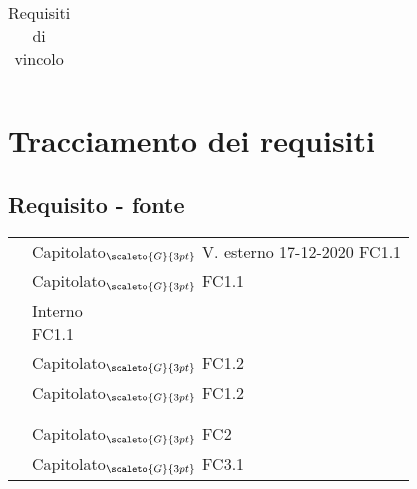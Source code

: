 {{{{\begin{center}
\begin{longtable}{|p{4cm}|p{4cm}|p{4cm}|p{3cm}|}
		\caption[Requisiti di vincolo]{Requisiti di vincolo}\label{4.4}\\
	\end{longtable}
\end{center}

\section{Tracciamento dei requisiti}\label{RequisitiTracciamentoDeiRequisiti}

\subsection{Requisito - fonte}\label{RequisitiTracciamentoDeiRequisitiFonte}

\def\tabularxcolumn#1{m{#1}}
{
	\begin{center}
		\renewcommand{\arraystretch}{1.4}
		\begin{longtable}{|p{7.5cm}|p{7.5cm}|}
		\hline
		\rowcolor{airforceblue}
		\makecell[tc]{\textbf{Codice RS}} & \makecell[c]{\textbf{Fonte}}  \\
		\hline
		\makecell[tc]{RSFO1} & \makecell[tc]{Capitolato$_{\scaleto{G}{3pt}}$\\V. esterno 17-12-2020 \\ FC1.1} \\
		\hline
		\makecell[tc]{RSFF2} & \makecell[tc]{Capitolato$_{\scaleto{G}{3pt}}$ \\ FC1.1}\\
		\hline
		\makecell[tc]{RSFO3} & \makecell[tc]{Interno\\FC1.1}\\
		\hline
		\makecell[tc]{RSFO4.1} & \makecell[tc]{Capitolato$_{\scaleto{G}{3pt}}$\\FC1.2}\\
		\hline
		\makecell[tc]{RSFO4.2} & \makecell[tc]{Capitolato$_{\scaleto{G}{3pt}}$\\FC1.2}\\
		\hline
		\makecell[tc]{RSFO5} & \makecell[tc]{Capitolato$_{\scaleto{G}{3pt}}$}\\
		\hline
		\makecell[tc]{RSFO5.1} & \makecell[tc]{Capitolato$_{\scaleto{G}{3pt}}$}\\
		\hline
		\makecell[tc]{RSFD6 }& \makecell[tc]{Capitolato$_{\scaleto{G}{3pt}}$ \\ FC2}\\
		\hline
		\makecell[tc]{RSFO7} & \makecell[tc]{Capitolato$_{\scaleto{G}{3pt}}$\\FC3.1}\\

\end{longtable}
\end{center}}}}}}
